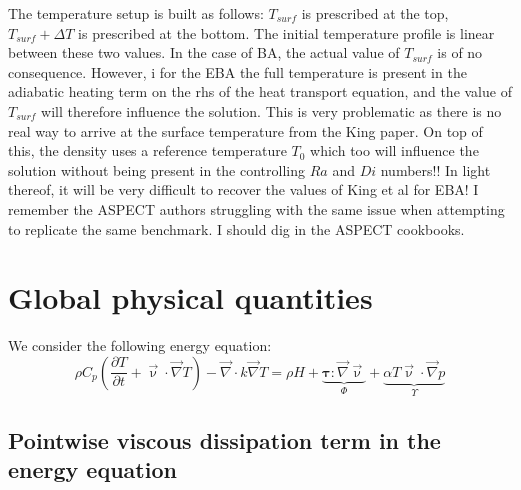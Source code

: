 \documentclass[a4paper,11pt]{article}
\begin{document}
The temperature setup is built as follows: $T_{surf}$ is prescribed at the top, 
$T_{surf}+\Delta T$ is prescribed at the bottom. The initial temperature profile 
is linear between these two values. 
In the case of BA, the actual value of $T_{surf}$ is of no consequence. However, i
for the EBA the full temperature is present in the adiabatic heating term on the 
rhs of the heat transport equation, and the value of $T_{surf}$ will therefore 
influence the solution. This is very problematic as there is no real way 
to arrive at the surface temperature from the King paper. On top of this, 
the density uses a reference temperature $T_0$ which too will influence the solution 
without being present in the controlling $Ra$ and $Di$ numbers!!
In light thereof, it will be very difficult to recover the values of King et al for EBA!
I remember the ASPECT authors struggling with the same issue when attempting to 
replicate the same benchmark. I should dig in the ASPECT cookbooks. 




\newpage
\section{Global physical quantities}

We consider the following energy equation:
\[
\rho C_p \left(\frac{\partial T}{\partial t} + \vec \upnu\cdot\vec\nabla T\right)
- \vec\nabla\cdot k\vec\nabla T 
= \rho H + \underbrace{ {\bm \tau} : \vec\nabla \vec\upnu } _{\Phi}
+ \underbrace{\alpha T  \vec\upnu \cdot \vec\nabla p }_{\Upsilon}
\]




\subsection{Pointwise viscous dissipation term in the energy equation}
\end{document}
